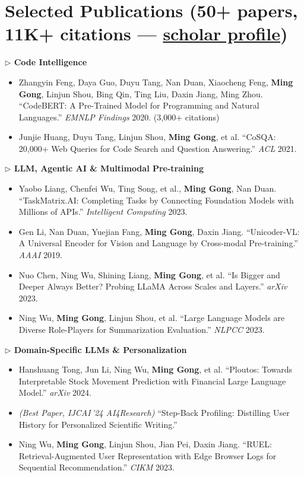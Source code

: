 \documentclass[10.5pt,letterpaper]{article}
\begin{document}
\section*{Selected Publications {\normalsize\normalfont(50+ papers, 11K+ citations --- \href{https://scholar.google.com/citations?user=c7JEFwsAAAAJ}{scholar profile})}}

\noindent\textcolor{accent}{\textbf{$\triangleright$ Code Intelligence}}
\begin{itemize}
  \item Zhangyin Feng, Daya Guo, Duyu Tang, Nan Duan, Xiaocheng Feng, \textbf{Ming Gong}, Linjun Shou, Bing Qin, Ting Liu, Daxin Jiang, Ming Zhou. ``CodeBERT: A Pre-Trained Model for Programming and Natural Languages.'' \textit{EMNLP Findings} 2020. (3,000+ citations)
  \item Junjie Huang, Duyu Tang, Linjun Shou, \textbf{Ming Gong}, et al. ``CoSQA: 20,000+ Web Queries for Code Search and Question Answering.'' \textit{ACL} 2021.
\end{itemize}

\noindent\textcolor{accent}{\textbf{$\triangleright$ LLM, Agentic AI \& Multimodal Pre-training}}
\begin{itemize}
  \item Yaobo Liang, Chenfei Wu, Ting Song, et al., \textbf{Ming Gong}, Nan Duan. ``TaskMatrix.AI: Completing Tasks by Connecting Foundation Models with Millions of APIs.'' \textit{Intelligent Computing} 2023.
  \item Gen Li, Nan Duan, Yuejian Fang, \textbf{Ming Gong}, Daxin Jiang. ``Unicoder-VL: A Universal Encoder for Vision and Language by Cross-modal Pre-training.'' \textit{AAAI} 2019.
  \item Nuo Chen, Ning Wu, Shining Liang, \textbf{Ming Gong}, et al. ``Is Bigger and Deeper Always Better? Probing LLaMA Across Scales and Layers.'' \textit{arXiv} 2023.
  \item Ning Wu, \textbf{Ming Gong}, Linjun Shou, et al. ``Large Language Models are Diverse Role-Players for Summarization Evaluation.'' \textit{NLPCC} 2023.
\end{itemize}

\noindent\textcolor{accent}{\textbf{$\triangleright$ Domain-Specific LLMs \& Personalization}}
\begin{itemize}
  \item Hanshuang Tong, Jun Li, Ning Wu, \textbf{Ming Gong}, et al. ``Ploutos: Towards Interpretable Stock Movement Prediction with Financial Large Language Model.'' \textit{arXiv} 2024.
  \item \textit{(Best Paper, IJCAI\,'24 AI4Research)} ``Step-Back Profiling: Distilling User History for Personalized Scientific Writing.''
  \item Ning Wu, \textbf{Ming Gong}, Linjun Shou, Jian Pei, Daxin Jiang. ``RUEL: Retrieval-Augmented User Representation with Edge Browser Logs for Sequential Recommendation.'' \textit{CIKM} 2023.
\end{itemize}
\end{document}
